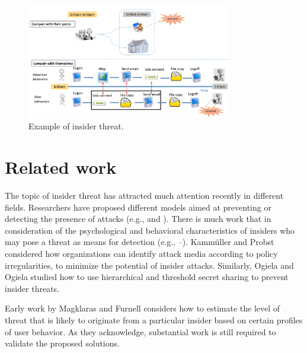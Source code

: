\documentclass[conference]{IEEEtran}
\begin{document}
\begin{figure}[htb]
\centerline{\includegraphics[width = 0.8\textwidth]{figure/figure1.png}}
\caption{Example of insider threat.}
\label{fig}
\end{figure}


\section{Related work}


The topic of insider threat has attracted much attention recently in different fields. Researchers have proposed different models aimed at preventing or detecting the presence of attacks (e.g., \cite{b16}and \cite{b17}). There is much work that in consideration of the psychological and behavioral characteristics of insiders who may pose a threat as means for detection (e.g., \cite{b18}–\cite{b19}). Kammüller and Probst \cite{b20} considered how organizations can identify attack media according to policy irregularities, to minimize the potential of insider attacks. Similarly, Ogiela and Ogiela \cite{b21} studied how to use hierarchical and threshold secret sharing to prevent insider threats. 

Early work by Magklaras and Furnell\cite{b22} considers how to estimate the level of threat that is likely to originate from a particular insider based on certain profiles of user behavior. As they acknowledge, substantial work is still required to validate the proposed solutions.
\end{document}
